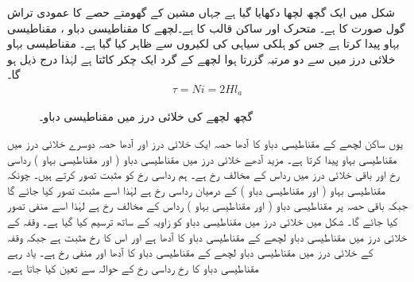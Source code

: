 شکل   میں ایک  گچھ لچھا  دکھایا گیا ہے جہاں مشین کے گھومتے حصے کا عمودی تراش گول صورت کا  ہے۔ متحرک اور ساکن  قالب  کا  ہے۔لچھے کا مقناطیسی دباو ،  مقناطیسی بہاو  پیدا کرتا  ہے جس کو ہلکی سیاہی کی  لکیروں سے ظاہر کیا گیا ہے۔ مقناطیسی بہاو خلائی درز میں سے دو مرتبہ گزرتا ہوا لچھے کے گرد ایک چکر کاٹتا ہے لہٰذا  درج ذیل ہو گا۔
\begin{align}
\tau=N i=2 H l_a
\end{align}
%
\begin{figure}
\centering
\caption{گچھ لچھے کی خلائی درز میں مقناطیسی دباو۔}
\label{شکل_گھومتے_مشین_گچھ_لچھے_کا_دباو}
\end{figure}

یوں ساکن لچھے کے مقناطیسی دباو  کا  آدھا حصہ  ایک خلائی درز اور آدھا حصہ  دوسرے خلائی درز میں مقناطیسی بہاو پیدا کرتا ہے۔ مزید  آدھے خلائی درز میں مقناطیسی دباو ( اور  مقناطیسی بہاو )  رداسی رخ  اور باقی خلائی درز میں  رداس کے مخالف رخ ہے۔ ہم رداسی رخ  کو مثبت تصور کرتے ہیں۔ چونکہ مقناطیسی بہاو ( اور مقناطیسی دباو )  کے درمیان رداسی رخ ہے لہٰذا اسے مثبت تصور کیا جائے گا جبکہ باقی حصہ پر مقناطیسی دباو ( اور مقناطیسی بہاو ) رداس کے مخالف رخ ہے لہٰذا  اسے منفی تصور کیا جائے گا۔  شکل  میں خلائی درز میں مقناطیسی دباو کو زاویہ کے ساتھ ترسیم کیا گیا ہے۔ وقفہ  کے خلائی درز میں مقناطیسی دباو  لچھے کے مقناطیسی دباو  کا آدھا ہے اور اس کا رخ مثبت ہے جبکہ وقفہ  کے خلائی درز میں مقناطیسی دباو لچھے کے مقناطیسی دباو کا آدھا  اور منفی رخ  ہے۔ یاد رہے مقناطیسی دباو کا رخ  رداسی رخ کے حوالہ  سے تعین کیا جاتا ہے۔

